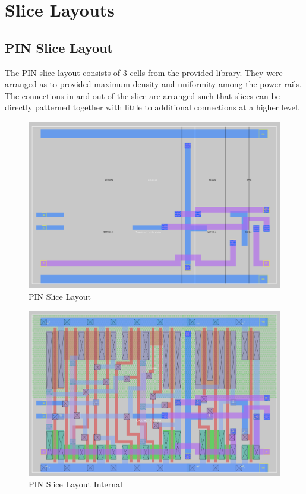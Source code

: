 \section{Slice Layouts}
    \subsection{PIN Slice Layout}
        The PIN slice layout consists of 3 cells from the provided library.
        They were arranged as to provided maximum density and uniformity among
        the power rails.  The connections in and out of the slice are arranged
        such that slices can be directly patterned together with little to
        additional connections at a higher level.
        \begin{figure}[H]
            \centering
            \includegraphics[width=0.75\linewidth]{../../magic/images/pin_slice.png}
            \caption{PIN Slice Layout}
        \end{figure}
        \begin{figure}[H]
            \centering
            \includegraphics[width=0.75\linewidth]{../../magic/images/pin_slice_internal.png}
            \caption{PIN Slice Layout Internal}
        \end{figure}
